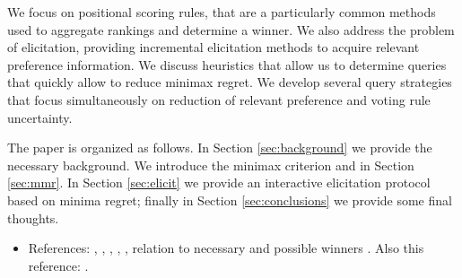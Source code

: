 \documentclass[12pt]{article}
\begin{document}
We focus on positional scoring rules, that  are a particularly common methods used to aggregate rankings and determine  a winner.
We also address the problem of elicitation, providing incremental elicitation methods to acquire relevant preference information. 
We discuss  heuristics that allow us to determine queries that quickly allow to reduce minimax regret.
We develop several query strategies that  focus simultaneously on reduction of relevant preference and voting rule uncertainty.





The paper is organized as follows.
In Section \ref{sec:background} we provide the necessary background.
We introduce the minimax criterion and in Section \ref{sec:mmr}.
In Section \ref{sec:elicit} we provide an interactive elicitation protocol based on minima regret; finally in Section 
\ref{sec:conclusions} we provide some final thoughts.

\begin{itemize}
\item References: \cite{Cailloux2014}, \cite{Llamazares2013}, \cite{Konczak05}, \cite{Kalech2011}, \cite{Pini2009}, relation to necessary and possible winners \cite{Xia2008}.
Also this reference: \cite{Naamani-Dery2015}.
\end{itemize}

\end{document}
